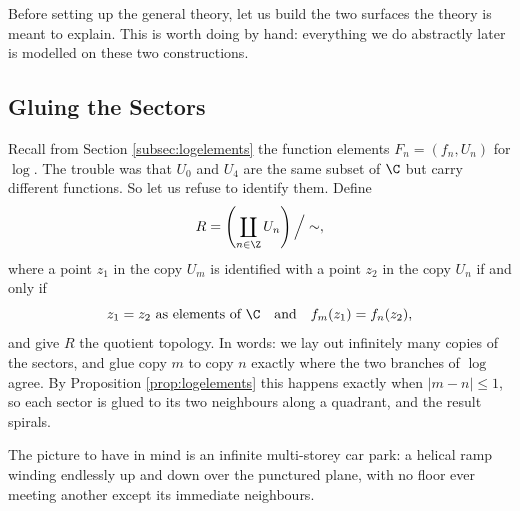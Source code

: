 Before setting up the general theory, let us build the two surfaces the theory is meant
to explain. This is worth doing by hand: everything we do abstractly later is modelled
on these two constructions.

\subsection{Gluing the Sectors}

Recall from Section \ref{subsec:logelements} the function elements $F_n = (f_n, U_n)$
for $\log$. The trouble was that $U_0$ and $U_4$ are the same subset of $\C$ but carry
different functions. So let us refuse to identify them. Define
$$
R = \left( \coprod_{n \in \Z} U_n \right) \Big/ \sim,
$$
where a point $z_1$ in the copy $U_m$ is identified with a point $z_2$ in the copy $U_n$
if and only if
$$
z_1 = z_2 \text{ as elements of } \C \quad \text{and} \quad f_m(z_1) = f_n(z_2),
$$
and give $R$ the quotient topology. In words: we lay out infinitely many copies of the
sectors, and glue copy $m$ to copy $n$ exactly where the two branches of $\log$ agree. By
Proposition \ref{prop:logelements} this happens exactly when $|m - n| \leq 1$, so each
sector is glued to its two neighbours along a quadrant, and the result spirals.

The picture to have in mind is an infinite multi-storey car park: a helical ramp winding
endlessly up and down over the punctured plane, with no floor ever meeting another except
its immediate neighbours.

\begin{center}
\end{center}


